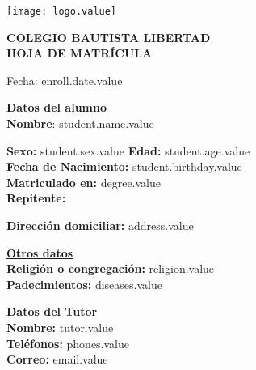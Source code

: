 \documentclass[12pt]{article}
\newcommand{\aField}[1]{#1}
\newcommand{\studentName}{student.name.value}
\newcommand{\studentBirthday}{student.birthday.value}
\newcommand{\studentAge}{student.age.value}
\newcommand{\studentSex}{student.sex.value}
\newcommand{\degree}{degree.value}
\newcommand{\address}{address.value}
\newcommand{\religion}{religion.value}
\newcommand{\diseases}{diseases.value}
\newcommand{\tutor}{tutor.value}
\newcommand{\phones}{phones.value}
\newcommand{\email}{email.value}
\newcommand{\enrollDate}{enroll.date.value}
\begin{document}
    \begin{minipage}[c][2.5cm]{0.2\textwidth}
        \texttt{[image: logo.value]}
    \end{minipage}
    \begin{minipage}[c][2.5cm]{0.6\textwidth}
        \begin{center}
            \textbf{\large COLEGIO BAUTISTA LIBERTAD\\HOJA DE MATRÍCULA}
        \end{center}
    \end{minipage}
    
    \hfill Fecha: \enrollDate
    
    \textbf{\uline{Datos del alumno}}\\
    \textbf{Nombre}: \aField{\studentName}
    \par\vspace{1mm}
    \begin{minipage}[t]{0.48\textwidth}
        \textbf{Sexo:} \aField{\studentSex}\hspace{7mm} \textbf{Edad:} \aField{\studentAge}\\
        \textbf{Fecha de Nacimiento:} \aField{\studentBirthday}\\
        \textbf{Matriculado en:} \aField{\degree}\\
        \textbf{Repitente:} \aField{\enrollRecord}
    \end{minipage}
    \hfill
    \begin{minipage}[t]{0.48\textwidth}
        \textbf{Dirección domiciliar:} \aField{\address}
    \end{minipage}
    \par\vspace{4mm}
    \begin{minipage}[t]{0.48\textwidth}
        \textbf{\uline{Otros datos}}\\
        \textbf{Religión o congregación:} \aField{\religion}\\
        \textbf{Padecimientos:} \aField{\diseases}
    \end{minipage}
    \hfill
    \begin{minipage}[t]{0.48\textwidth}
        \textbf{\uline{Datos del Tutor}}\\
        \textbf{Nombre:} \aField{\tutor}\\
        \textbf{Teléfonos:} \aField{\phones}\\
        \textbf{Correo:} \aField{\email}
    \end{minipage}
\end{document}
